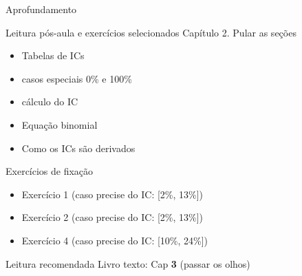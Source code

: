 \documentclass{beamer}
\begin{document}
\begin{frame}{\scriptsize Aprofundamento}
  \begin{block}{Leitura pós-aula e exercícios selecionados}
    \footnotesize
    Capítulo 2. Pular as seções
    \begin{itemize}
      \scriptsize
    \item Tabelas de ICs
    \item casos especiais 0\% e 100\%
    \item cálculo do IC
    \item Equação binomial
    \item Como os ICs são derivados
    \end{itemize}
  \end{block}

  \begin{block}{Exercícios de fixação}
    \begin{itemize}
      \scriptsize
    \item Exercício 1 (caso precise do IC: [2\%, 13\%])
    \item Exercício 2 (caso precise do IC: [2\%, 13\%])
    \item Exercício 4 (caso precise do IC: [10\%, 24\%])
    \end{itemize}
  \end{block}

  \begin{block}{Leitura recomendada}
    \scriptsize
    Livro texto: Cap {\bf 3} (passar os olhos)
  \end{block}
\end{frame}
\end{document}

